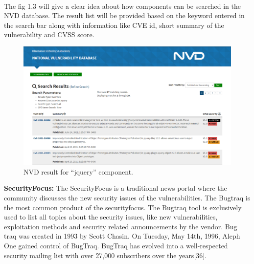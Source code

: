 \paragraph{}
The fig 1.3 will give a clear idea about how components can be searched in the NVD database. The result list will be provided based on the keyword entered in the search bar along with information like CVE id, short summary of the vulnerability and CVSS score.
\newpage
\begin{figure}[h!]
	\includegraphics[width=15cm]{includes/nvd.png}
	\centering
	\caption{NVD result for “jquery” component.}
	\label{fig:nvd}
\end{figure}

{\bf SecurityFocus:} The SecurityFocus is a traditional news portal where the community discusses the new security issues of the vulnerabilities. The Bugtraq is the most common product of the securityfocus. The Bugtraq tool is exclusively used to list all topics about the security issues, like new vulnerabilities, exploitation methods and security related announcements by the vendor. Bug traq was created in 1993 by Scott Chasin. On Tuesday, May 14th, 1996, Aleph One gained control of BugTraq. BugTraq has evolved into a well-respected security mailing list with over 27,000 subscribers over the years[36].

